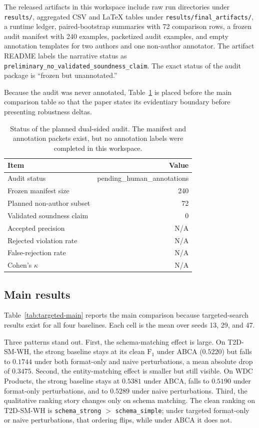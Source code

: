 \documentclass{article}
\newcommand{\abca}{\textsc{ABCA}}
\newcommand{\fonescore}{\ensuremath{\mathrm{F}_{1}}}
\begin{document}
The released artifacts in this workspace include raw run directories under \texttt{results/}, aggregated CSV and \LaTeX{} tables under \texttt{results/final\_artifacts/}, a runtime ledger, paired-bootstrap summaries with 72 comparison rows, a frozen audit manifest with 240 examples, packetized audit examples, and empty annotation templates for two authors and one non-author annotator. The artifact README labels the narrative status as \texttt{preliminary\_no\_validated\_soundness\_claim}. The exact status of the audit package is ``frozen but unannotated.''

Because the audit was never annotated, Table~\ref{tab:audit-status} is placed before the main comparison table so that the paper states its evidentiary boundary before presenting robustness deltas.

\begin{table}[t]
\caption{Status of the planned dual-sided audit. The manifest and annotation packets exist, but no annotation labels were completed in this workspace.}
\label{tab:audit-status}
\centering
\small
\begin{tabular}{lr}
\toprule
Item & Value \\
\midrule
Audit status & pending\_human\_annotations \\
Frozen manifest size & 240 \\
Planned non-author subset & 72 \\
Validated soundness claim & 0 \\
Accepted precision & N/A \\
Rejected violation rate & N/A \\
False-rejection rate & N/A \\
Cohen's $\kappa$ & N/A \\
\bottomrule
\end{tabular}
\end{table}

\subsection{Main results}
Table~\ref{tab:targeted-main} reports the main comparison because targeted-search results exist for all four baselines. Each cell is the mean over seeds 13, 29, and 47.

Three patterns stand out. First, the schema-matching effect is large. On T2D-SM-WH, the strong baseline stays at its clean \fonescore{} under \abca{} ($0.5220$) but falls to $0.1744$ under both format-only and naive perturbations, a mean absolute drop of $0.3475$. Second, the entity-matching effect is smaller but still visible. On WDC Products, the strong baseline stays at $0.5381$ under \abca{}, falls to $0.5190$ under format-only perturbations, and to $0.5289$ under naive perturbations. Third, the qualitative ranking story changes only on schema matching. The clean ranking on T2D-SM-WH is \texttt{schema\_strong} $>$ \texttt{schema\_simple}; under targeted format-only or naive perturbations, that ordering flips, while under \abca{} it does not.
\end{document}
